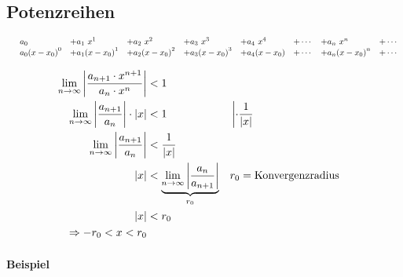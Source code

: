 \subsection{Potenzreihen}

\[
    \begin{array}{lll lll lll}
    &a_0 & + a_1\ x^1 & + a_2\ x^2 & + a_3\ x^3 & + a_4\ x^4 & + \cdots & + a_n\ x^n & + \cdots \\
    &a_0 {(x-x_0)}^0 & + a_1 {(x-x_0)}^1 & + a_2 {(x-x_0)}^2 & + a_3 {(x-x_0)}^3 & + a_4 (x-x_0) & + \cdots & + a_n {(x-x_0)}^n & + \cdots
    \end{array}    
\]

\begin{align*}
    \lim_{n \rightarrow{} \infty} \left| \frac{a_{n+1} \cdot x^{n+1}}{a_n \cdot x^n} \right| &< 1 \\
    \lim_{n \rightarrow{} \infty} \left| \frac{a_{n+1}}{a_n} \right| \cdot | x | &< 1 &&\left| \cdot \frac{1}{| x |} \right. \\
    \lim_{n \rightarrow{} \infty} \left| \frac{a_{n+1}}{a_n} \right| &< \frac{1}{| x |} \\
    | x | &< \underbrace{\lim_{n \rightarrow{} \infty} \left| \frac{a_n}{a_{n+1}} \right|}_{r_0} && r_0 = \text{Konvergenzradius} \\
    | x | &< r_0 \\
    \Rightarrow -r_0 < x < r_0
\end{align*}

\begin{figure}[H]
    \centering
\end{figure}

\paragraph{Beispiel}

